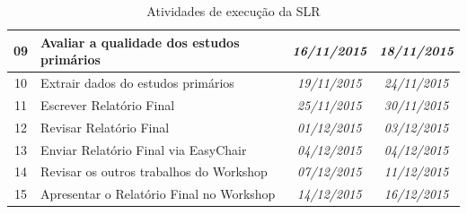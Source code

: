 \documentclass{article}
\begin{document}
\begin{table}[htb]
{\begin{tabular}{|c|l|c|c|}
09          & Avaliar a qualidade dos estudos primários                                                                                                 & \textit{16/11/2015}                              & \textit{18/11/2015}                               \\ \hline
10          & Extrair dados do estudos primários                                                                                                        & \textit{19/11/2015}                              & \textit{24/11/2015}                               \\ \hline
11          & Escrever Relatório Final                                                                                                                  & \textit{25/11/2015}                              & \textit{30/11/2015}                               \\ \hline
12          & Revisar Relatório Final                                                                                                                   & \textit{01/12/2015}                              & \textit{03/12/2015}                               \\ \hline
13          & Enviar Relatório Final via EasyChair                                                                                                      & \textit{04/12/2015}                              & \textit{04/12/2015}                               \\ \hline
14          & Revisar os outros trabalhos do Workshop                                                                                                   & \textit{07/12/2015}                              & \textit{11/12/2015}                               \\ \hline
15          & Apresentar o Relatório Final no Workshop                                                                                                  & \textit{14/12/2015}                              & \textit{16/12/2015}                               \\ \hline
\end{tabular}
}
\caption{Atividades de execução da SLR}
\label{tab:cronograma}
\end{table}

\pagebreak

\medskip

\end{document}

